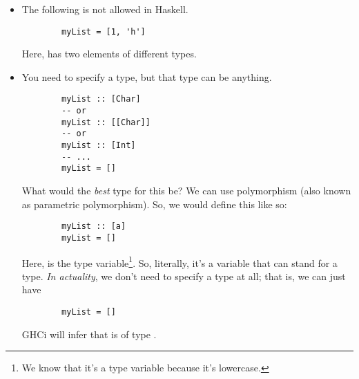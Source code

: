 \documentclass[letterpaper]{article}
\begin{document}
\begin{itemize}
    \item The following is not allowed in Haskell. 
    \begin{verbatim}
        myList = [1, 'h']\end{verbatim}
    Here,  has two elements of different types. 

    \item You need to specify a type, but that type can be anything. 
    \begin{verbatim}
        myList :: [Char]
        -- or 
        myList :: [[Char]]
        -- or 
        myList :: [Int]
        -- ... 
        myList = []\end{verbatim} 
    What would the \emph{best} type for this be? We can use polymorphism (also known as parametric polymorphism). So, we would define this like so: 
    \begin{verbatim}
        myList :: [a]
        myList = []\end{verbatim}
    Here,  is the type variable\footnote{We know that it's a type variable because it's lowercase.}. So, literally, it's a variable that can stand for a type. \emph{In actuality}, we don't need to specify a type at all; that is, we can just have 
    \begin{verbatim}
        myList = []\end{verbatim}
    GHCi will infer that  is of type \code{[a]}.
\end{itemize}
\end{document}
